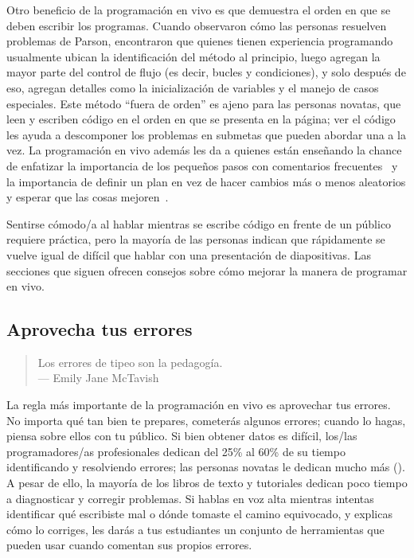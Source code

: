 Otro beneficio de la programación en vivo es que demuestra el orden en que se deben escribir los programas.
Cuando \cite{Ihan2011} observaron cómo las personas resuelven problemas de Parson,
encontraron que quienes tienen experiencia programando usualmente ubican la identificación del método al principio,
luego agregan la mayor parte del control de flujo (es decir, bucles y condiciones),
y solo después de eso, agregan detalles como la inicialización de variables y el manejo de casos especiales.
Este método ``fuera de orden'' es ajeno para las personas novatas,
que leen y escriben código en el orden en que se presenta en la página;
ver el código les ayuda a descomponer los problemas en sub\-metas que pueden abordar una a la vez.
La programación en vivo además les da a quienes están enseñando la chance de enfatizar la importancia de los pequeños pasos con comentarios frecuentes~\cite{Blik2014}
y la importancia de definir un plan en vez de hacer
cambios más o menos aleatorios y esperar que las cosas mejoren~\cite{Spoh1985}.

Sentirse cómodo/a al hablar mientras se escribe código en
frente de un público requiere práctica,
pero la mayoría de las personas indican que rápidamente se vuelve igual de difícil que hablar con una presentación de diapositivas.
Las secciones que siguen ofrecen consejos sobre cómo mejorar la manera de programar en vivo.

\subsection*{Aprovecha tus errores}

\begin{quote}

  Los errores de tipeo son la pedagogía. \\
  --- Emily Jane McTavish

\end{quote}

La regla más importante de la programación en vivo es aprovechar tus errores.
No importa qué tan bien te prepares,
cometerás algunos errores;
cuando lo hagas,
piensa sobre ellos con tu público.
Si bien obtener datos es difícil,
los/las programadores/as profesionales dedican del 25\% al 60\% de su tiempo identificando y resolviendo errores;
las personas novatas le dedican mucho más ().
A pesar de ello, la mayoría de los libros de texto y tutoriales dedican poco tiempo a diagnosticar y corregir problemas.
Si hablas en voz alta mientras intentas identificar qué escribiste mal
o dónde tomaste el camino equivocado,
y explicas cómo lo corriges,
les darás a tus estudiantes un conjunto de herramientas que pueden usar cuando comentan sus propios errores.

